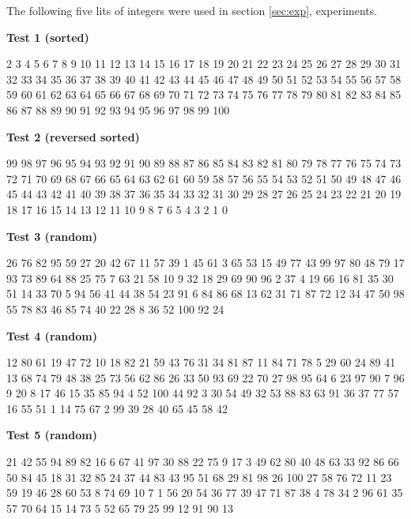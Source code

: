 The following five lits of integers were used in section \ref{sec:exp}, experiments.

\noindent\textbf{Test 1 (sorted)}

 2 3 4 5 6 7 8 9 10 11 12 13 14 15 16 17 18 19 20 21 22 23 24 25 26 27 28 29 30 31 32 33 34 35 36 37 38 39 40 41 42 43 44 45 46 47 48 49 50 51 52 53 54 55 56 57 58 59 60 61 62 63 64 65 66 67 68 69 70 71 72 73 74 75 76 77 78 79 80 81 82 83 84 85 86 87 88 89 90 91 92 93 94 95 96 97 98 99 100

\noindent\textbf{Test 2 (reversed sorted)}

 99 98 97 96 95 94 93 92 91 90 89 88 87 86 85 84 83 82 81 80 79 78 77 76 75 74 73 72 71 70 69 68 67 66 65 64 63 62 61 60 59 58 57 56 55 54 53 52 51 50 49 48 47 46 45 44 43 42 41 40 39 38 37 36 35 34 33 32 31 30 29 28 27 26 25 24 23 22 21 20 19 18 17 16 15 14 13 12 11 10 9 8 7 6 5 4 3 2 1 0



\noindent\textbf{Test 3 (random)}

 26 76 82 95 59 27 20 42 67 11 57 39 1 45 61 3 65 53 15 49 77 43 99 97 80 48 79 17 93 73 89 64 88 25 75 7 63 21 58 10 9 32 18 29 69 90 96 2 37 4 19 66 16 81 35 30 51 14 33 70 5 94 56 41 44 38 54 23 91 6 84 86 68 13 62 31 71 87 72 12 34 47 50 98 55 78 83 46 85 74 40 22 28 8 36 52 100 92 24



\noindent\textbf{Test 4 (random)}

 12 80 61 19 47 72 10 18 82 21 59 43 76 31 34 81 87 11 84 71 78 5 29 60 24 89 41 13 68 74 79 48 38 25 73 56 62 86 26 33 50 93 69 22 70 27 98 95 64 6 23 97 90 7 96 9 20 8 17 46 15 35 85 94 4 52 100 44 92 3 30 54 49 32 53 88 83 63 91 36 37 77 57 16 55 51 1 14 75 67 2 99 39 28 40 65 45 58 42

\noindent\textbf{Test 5 (random)}

 21 42 55 94 89 82 16 6 67 41 97 30 88 22 75 9 17 3 49 62 80 40 48 63 33 92 86 66 50 84 45 18 31 32 85 24 37 44 83 43 95 51 68 29 81 98 26 100 27 58 76 72 11 23 59 19 46 28 60 53 8 74 69 10 7 1 56 20 54 36 77 39 47 71 87 38 4 78 34 2 96 61 35 57 70 64 15 14 73 5 52 65 79 25 99 12 91 90 13